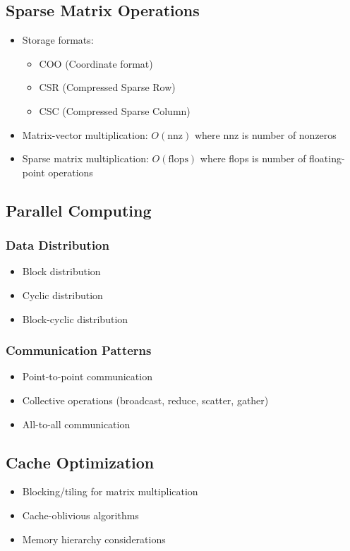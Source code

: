\subsection{Sparse Matrix Operations}
\begin{itemize}
    \item Storage formats:
        \begin{itemize}
            \item COO (Coordinate format)
            \item CSR (Compressed Sparse Row)
            \item CSC (Compressed Sparse Column)
        \end{itemize}
    \item Matrix-vector multiplication: $O(\text{nnz})$ where nnz is number of nonzeros
    \item Sparse matrix multiplication: $O(\text{flops})$ where flops is number of floating-point operations
\end{itemize}

\subsection{Parallel Computing}
\subsubsection{Data Distribution}
\begin{itemize}
    \item Block distribution
    \item Cyclic distribution
    \item Block-cyclic distribution
\end{itemize}

\subsubsection{Communication Patterns}
\begin{itemize}
    \item Point-to-point communication
    \item Collective operations (broadcast, reduce, scatter, gather)
    \item All-to-all communication
\end{itemize}

\subsection{Cache Optimization}
\begin{itemize}
    \item Blocking/tiling for matrix multiplication
    \item Cache-oblivious algorithms
    \item Memory hierarchy considerations
\end{itemize}

